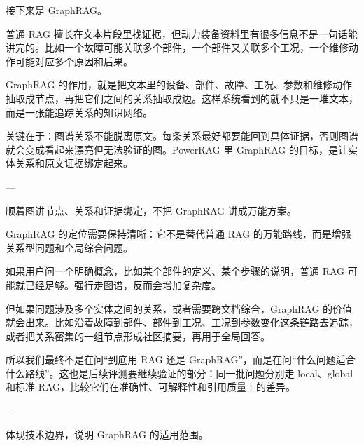 \documentclass[10pt, a4paper]{ctexart}
\begin{document}
\begin{tcolorbox}[colback=white, colframe=primary!35, title={\textbf{第 13 页：GraphRAG 把文本连接成实体关系}}, beforeafter skip=2.0pt]
\begin{minipage}[t]{0.72\textwidth}
  \linespread{1.0}\selectfont\footnotesize
  接下来是 GraphRAG。

普通 RAG 擅长在文本片段里找证据，但动力装备资料里有很多信息不是一句话能讲完的。比如一个故障可能关联多个部件，一个部件又关联多个工况，一个维修动作可能对应多个原因和后果。

GraphRAG 的作用，就是把文本里的设备、部件、故障、工况、参数和维修动作抽取成节点，再把它们之间的关系抽取成边。这样系统看到的就不只是一堆文本，而是一张能追踪关系的知识网络。

关键在于：图谱关系不能脱离原文。每条关系最好都要能回到具体证据，否则图谱就会变成看起来漂亮但无法验证的图。PowerRAG 里 GraphRAG 的目标，是让实体关系和原文证据绑定起来。

---
\end{minipage}
\hfill
\begin{minipage}[t]{0.25\textwidth}
  \fontsize{7.5}{9.5}\selectfont
  \begin{tcolorbox}[colback=orange!5, colframe=orange!45, title=\textbf{讲述重点}, left=0.6mm, right=0.6mm, top=0.8mm, bottom=0.8mm, arc=0.8mm, boxrule=0.4pt, beforeafter skip=0pt]
    顺着图讲节点、关系和证据绑定，不把 GraphRAG 讲成万能方案。
  \end{tcolorbox}
\end{minipage}
\end{tcolorbox}

\begin{tcolorbox}[colback=white, colframe=primary!35, title={\textbf{第 14 页：GraphRAG 不是替代所有 RAG}}, beforeafter skip=2.0pt]
\begin{minipage}[t]{0.72\textwidth}
  \linespread{1.0}\selectfont\footnotesize
  GraphRAG 的定位需要保持清晰：它不是替代普通 RAG 的万能路线，而是增强关系型问题和全局综合问题。

如果用户问一个明确概念，比如某个部件的定义、某个步骤的说明，普通 RAG 可能就已经足够。强行走图谱，反而会增加复杂度。

但如果问题涉及多个实体之间的关系，或者需要跨文档综合，GraphRAG 的价值就会出来。比如沿着故障到部件、部件到工况、工况到参数变化这条链路去追踪，或者把关系密集的一组节点形成社区摘要，再用于全局回答。

所以我们最终不是在问“到底用 RAG 还是 GraphRAG”，而是在问“什么问题适合什么路线”。这也是后续评测要继续验证的部分：同一批问题分别走 local、global 和标准 RAG，比较它们在准确性、可解释性和引用质量上的差异。

---
\end{minipage}
\hfill
\begin{minipage}[t]{0.25\textwidth}
  \fontsize{7.5}{9.5}\selectfont
  \begin{tcolorbox}[colback=orange!5, colframe=orange!45, title=\textbf{讲述重点}, left=0.6mm, right=0.6mm, top=0.8mm, bottom=0.8mm, arc=0.8mm, boxrule=0.4pt, beforeafter skip=0pt]
    体现技术边界，说明 GraphRAG 的适用范围。
  \end{tcolorbox}
\end{minipage}
\end{tcolorbox}
\end{document}
